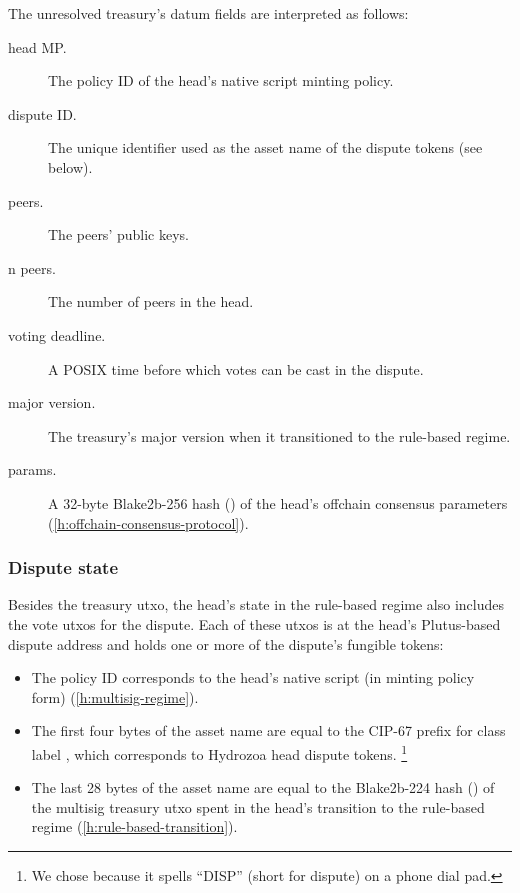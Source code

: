 \documentclass[../hydrozoa.tex]{subfiles}
\begin{document}
The unresolved treasury's datum fields are interpreted as follows:
\begin{description}
  \item[head MP.] The policy ID of the head's native script minting policy.
  \item[dispute ID.] The unique identifier used as the asset name of the dispute tokens (see below).
  \item[peers.] The peers' public keys.
  \item[n peers.] The number of peers in the head.
  \item[voting deadline.] A POSIX time before which votes can be cast in the dispute.
  \item[major version.] The treasury's major version when it transitioned to the rule-based regime.
  \item[params.] A 32-byte Blake2b-256 hash () of the head's offchain consensus parameters (\cref{h:offchain-consensus-protocol}).
\end{description}

\subsubsection{Dispute state}

Besides the treasury utxo, the head's state in the rule-based regime also includes the vote utxos for the dispute.
Each of these utxos is at the head's Plutus-based dispute address and holds one or more of the dispute's fungible tokens:
\begin{itemize}
  \item The policy ID corresponds to the head's native script (in minting policy form) (\cref{h:multisig-regime}).
  \item The first four bytes of the asset name are equal to the CIP-67
    \citep{AlessandroKonradThomasVellekoopCIP67AssetName2022}
    prefix for class label , which corresponds to Hydrozoa head dispute tokens.%
    \footnote{We chose  because it spells ``DISP'' (short for dispute) on a phone dial pad.}
  \item The last 28 bytes of the asset name are equal to the Blake2b-224 hash () of the multisig treasury utxo spent in the head's transition to the rule-based regime (\cref{h:rule-based-transition}).
\end{itemize}
\end{document}
